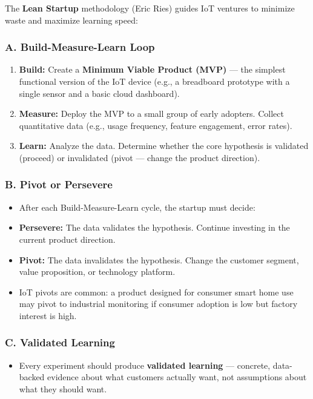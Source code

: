 The \textbf{Lean Startup} methodology (Eric Ries) guides IoT ventures to minimize waste and maximize learning speed:

\subsubsection{A. Build-Measure-Learn Loop}
\begin{enumerate}
  \item \textbf{Build:} Create a \textbf{Minimum Viable Product (MVP)} — the simplest functional version of the IoT device (e.g., a breadboard prototype with a single sensor and a basic cloud dashboard).
  \item \textbf{Measure:} Deploy the MVP to a small group of early adopters. Collect quantitative data (e.g., usage frequency, feature engagement, error rates).
  \item \textbf{Learn:} Analyze the data. Determine whether the core hypothesis is validated (proceed) or invalidated (pivot — change the product direction).
\end{enumerate}

\subsubsection{B. Pivot or Persevere}
\begin{itemize}
  \item   After each Build-Measure-Learn cycle, the startup must decide:
  \item   \textbf{Persevere:} The data validates the hypothesis. Continue investing in the current product direction.
  \item   \textbf{Pivot:} The data invalidates the hypothesis. Change the customer segment, value proposition, or technology platform.
  \item   IoT pivots are common: a product designed for consumer smart home use may pivot to industrial monitoring if consumer adoption is low but factory interest is high.
\end{itemize}

\subsubsection{C. Validated Learning}
\begin{itemize}
  \item   Every experiment should produce \textbf{validated learning} — concrete, data-backed evidence about what customers actually want, not assumptions about what they should want.
\end{itemize}


